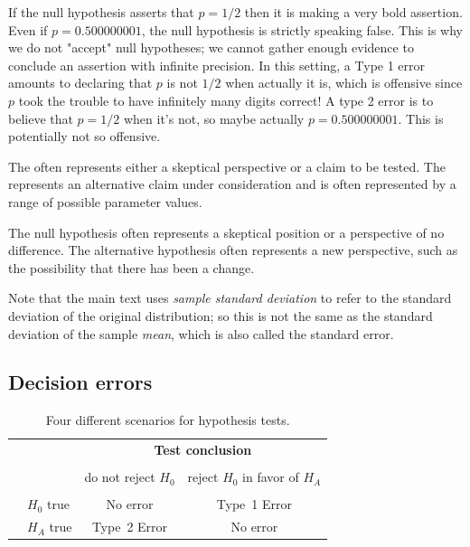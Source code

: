If the null hypothesis asserts that $p=1/2$ then it is making a very bold assertion. Even if $p=0.500000001$, the null hypothesis is strictly speaking false. This is why we do not "accept" null hypotheses; we cannot gather enough evidence to conclude an assertion with infinite precision. In this setting, a Type 1 error amounts to declaring that $p$ is not $1/2$ when actually it is, which is offensive since $p$ took the trouble to have infinitely many digits correct! A type 2 error is to believe that $p=1/2$ when it's not, so maybe actually $p=0.500000001$. This is potentially not so offensive.



\begin{termBox}{
{\small The  often represents either a skeptical perspective or a claim to be tested. The  represents an alternative claim under consideration and is often represented by a range of possible parameter values.}}
\end{termBox}

The null hypothesis often represents a skeptical position or a perspective of no difference. The alternative hypothesis often represents a new perspective, such as the possibility that there has been a change. 


Note that the main text uses \emph{sample standard deviation} to refer to the standard deviation of the original distribution; so this is not the same as the standard deviation of the sample \emph{mean}, which is also called the standard error.


\subsection{Decision errors}


\begin{table}%
\centering
\begin{tabular}{l l c c}
& & \multicolumn{2}{c}{\textbf{Test conclusion}} \\
  \cline{3-4}
\vspace{-3.7mm} \\
& & do not reject $H_0$ &  reject $H_0$ in favor of $H_A$ \\
  \cline{2-4}
\vspace{-3.7mm} \\
& $H_0$ true & No error &  Type~1 Error \\
\raisebox{1.5ex}{\textbf{Truth}} & $H_A$ true & Type~2 Error & No error \\
  \cline{2-4}
\end{tabular}
\caption{Four different scenarios for hypothesis tests.}
\label{fourHTScenarios}
\end{table}

